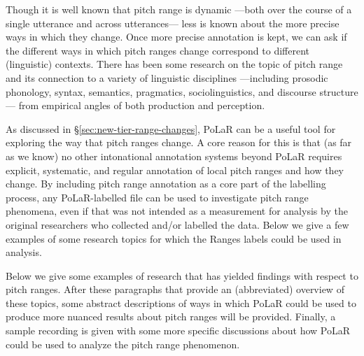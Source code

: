 \documentclass[11pt, twoside]{memoir}
\begin{document}
Though it is well known that pitch range is dynamic —both over the course of a single utterance and across utterances— less is known about the more precise ways in which they change. Once more precise annotation is kept, we can ask if the different ways in which pitch ranges change correspond to different (linguistic) contexts. There has been some research on the topic of pitch range and its connection to a variety of linguistic disciplines —including prosodic phonology, syntax, semantics, pragmatics, sociolinguistics, and discourse structure— from empirical angles of both production and perception.

As discussed in §\ref{sec:new-tier-range-changes}, PoLaR can be a useful tool for exploring the way that pitch ranges change. A core reason for this is that (as far as we know) no other intonational annotation systems beyond PoLaR requires explicit, systematic, and regular annotation of local pitch ranges and how they change. By including pitch range annotation as a core part of the labelling process, any PoLaR-labelled file can be used to investigate pitch range phenomena, even if that was not intended as a measurement for analysis by the original researchers who collected and/or labelled the data. Below we give a few examples of some research topics for which the Ranges labels could be used in analysis.

Below we give some examples of research that has yielded findings with respect to pitch ranges. After these paragraphs that provide an (abbreviated) overview of these topics, some abstract descriptions of ways in which PoLaR could be used to produce more nuanced results about pitch ranges will be provided. Finally, a sample recording is given with some more specific discussions about how PoLaR could be used to analyze the pitch range phenomenon.
\end{document}

